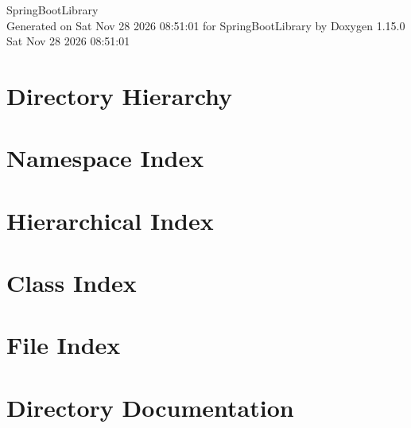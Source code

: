 \documentclass[twoside]{book}
\newcommand{\+}{\discretionary{\mbox{\scriptsize$\hookleftarrow$}}{}{}}
\newcommand{\clearemptydoublepage}{%
    \newpage{\pagestyle{empty}\cleardoublepage}%
  }
\begin{document}
  \raggedbottom
    \hypersetup{pageanchor=false,
                bookmarksnumbered=true,
                pdfencoding=unicode
               }
  \begin{titlepage}
  \vspace*{7cm}
  \begin{center}%
  {\Large Spring\+Boot\+Library}\\
  \vspace*{1cm}
  {\large Generated on Sat Nov 28 2026 08\+:51\+:01 for Spring\+Boot\+Library by Doxygen 1.15.0}\\
    \vspace*{0.5cm}
    {\small Sat Nov 28 2026 08:51:01}
  \end{center}
  \end{titlepage}
  \clearemptydoublepage
  \tableofcontents
  \clearemptydoublepage
  \hypersetup{pageanchor=true}

\chapter{Directory Hierarchy}

\chapter{Namespace Index}

\chapter{Hierarchical Index}

\chapter{Class Index}

\chapter{File Index}

\chapter{Directory Documentation}



















\end{document}
